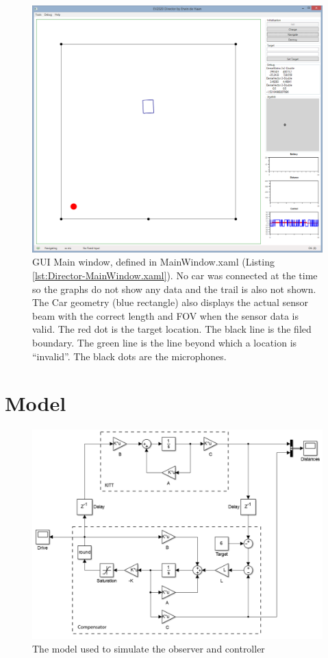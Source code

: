 \documentclass[final]{scrreprt} %
\begin{document}
\begin{appendices}
\begin{figure}[h]
\centering
	\includegraphics[width=\linewidth]{resources/UI-Main.png}
	\caption{GUI Main window, defined in MainWindow.xaml (Listing \ref{lst:Director-MainWindow.xaml}). No car was connected at the time so the graphs do not show any data and the trail is also not shown. The Car geometry (blue rectangle) also displays the actual sensor beam with the correct length and FOV when the sensor data is valid. The red dot is the target location. The black line is the filed boundary. The green line is the line beyond which a location is ``invalid''. The black dots are the microphones.}
	\label{fig:UI-Main}
\end{figure}

\chapter{Model}
\label{app:model}
\begin{figure}[H]
	\centering    	
    	\includegraphics[width=\textwidth]{resources/model.png}
    	\caption{The model used to simulate the observer and controller}
    	\label{app:model}
\end{figure}


\end{appendices}
\end{document}
